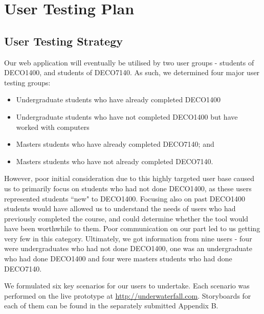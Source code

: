 \documentclass[10pt]{article}
\begin{document}
\newpage

\section*{User Testing Plan}

\subsection*{User Testing Strategy}

Our web application will eventually be utilised by two user groups - students of DECO1400, and students of DECO7140. As such, we determined four major user testing groups:

\begin{itemize}
\item Undergraduate students who have already completed DECO1400
\item Undergraduate students who have not completed DECO1400 but have worked with computers
\item Masters students who have already completed DECO7140; and
\item Masters students who have not already completed DECO7140.
\end{itemize}

However, poor initial consideration due to this highly targeted user base caused us to primarily focus on students who had not done DECO1400, as these users represented students ``new" to DECO1400. Focusing also on past DECO1400 students would have allowed us to understand the needs of users who had previously completed the course, and could determine whether the tool would have been worthwhile to them. Poor communication on our part led to us getting very few in this category. Ultimately, we got information from nine users - four were undergraduates who had not done DECO1400, one was an undergraduate who had done DECO1400 and four were masters students who had done DECO7140.

We formulated six key scenarios for our users to undertake. Each scenario was performed on the live prototype at \underline{\url{http://underwaterfall.com}}. Storyboards for each of them can be found in the separately submitted Appendix B.
\end{document}
